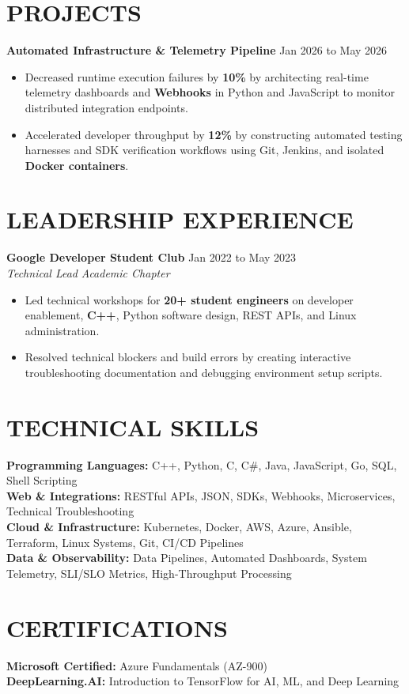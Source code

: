 \documentclass[11pt,letterpaper]{article}
\begin{document}
\section*{PROJECTS}
\noindent\small \textbf{Automated Infrastructure \& Telemetry Pipeline} \hfill Jan 2026 to May 2026
\begin{itemize}
\item Decreased runtime execution failures by \textbf{10\%} by architecting real-time telemetry dashboards and \textbf{Webhooks} in Python and JavaScript to monitor distributed integration endpoints.
\item Accelerated developer throughput by \textbf{12\%} by constructing automated testing harnesses and SDK verification workflows using Git, Jenkins, and isolated \textbf{Docker containers}.
\end{itemize}
\section*{LEADERSHIP EXPERIENCE}
\noindent\small \textbf{Google Developer Student Club} \hfill Jan 2022 to May 2023 \\
\textit{Technical Lead} \hfill \textit{Academic Chapter}
\begin{itemize}
\item Led technical workshops for \textbf{20+ student engineers} on developer enablement, \textbf{C++}, Python software design, REST APIs, and Linux administration.
\item Resolved technical blockers and build errors by creating interactive troubleshooting documentation and debugging environment setup scripts.
\end{itemize}
\section*{TECHNICAL SKILLS}
\noindent\small \textbf{Programming Languages:} C++, Python, C, C#, Java, JavaScript, Go, SQL, Shell Scripting \\
\textbf{Web \& Integrations:} RESTful APIs, JSON, SDKs, Webhooks, Microservices, Technical Troubleshooting \\
\textbf{Cloud \& Infrastructure:} Kubernetes, Docker, AWS, Azure, Ansible, Terraform, Linux Systems, Git, CI/CD Pipelines \\
\textbf{Data \& Observability:} Data Pipelines, Automated Dashboards, System Telemetry, SLI/SLO Metrics, High-Throughput Processing
\section*{CERTIFICATIONS}
\noindent\small \textbf{Microsoft Certified:} Azure Fundamentals (AZ-900) \\
\textbf{DeepLearning.AI:} Introduction to TensorFlow for AI, ML, and Deep Learning
\end{document}
